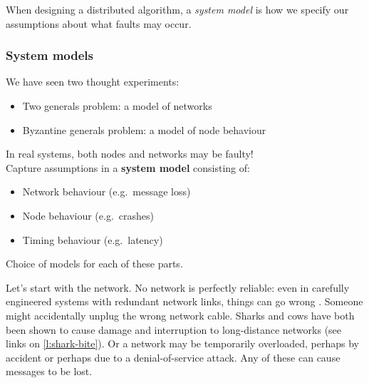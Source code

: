 When designing a distributed algorithm, a \emph{system model} is how we specify our assumptions about what faults may occur.

\begin{frame}
    \label{s:system-model}
    \frametitle{System models}
    We have seen two thought experiments:
    \begin{itemize}
        \item Two generals problem: a model of networks
        \item Byzantine generals problem: a model of node behaviour
    \end{itemize}
    In real systems, both nodes and networks may be faulty!\\[2em]\pause
    Capture assumptions in a \textbf{system model} consisting of:
    \begin{itemize}
        \item Network behaviour (e.g.\ message loss)
        \item Node behaviour (e.g.\ crashes)
        \item Timing behaviour (e.g.\ latency)
    \end{itemize}
    Choice of models for each of these parts.
\end{frame}
\label{l:system-model}

Let's start with the network.
No network is perfectly reliable: even in carefully engineered systems with redundant network links, things can go wrong \citep{Bailis:2014jx}.
Someone might accidentally unplug the wrong network cable.
Sharks and cows have both been shown to cause damage and interruption to long-distance networks (see links on \autoref{l:shark-bite}).
Or a network may be temporarily overloaded, perhaps by accident or perhaps due to a denial-of-service attack.
Any of these can cause messages to be lost.

